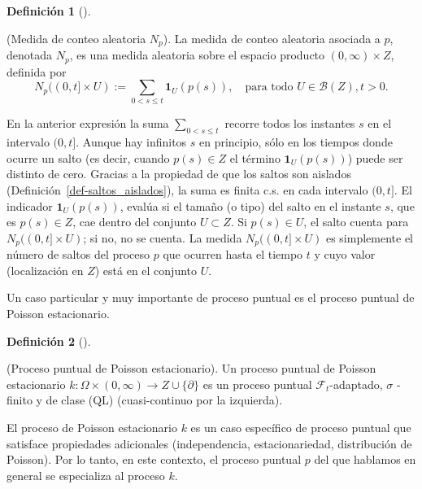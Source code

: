 \documentclass[
  spanish,
  us-letterpaper,
]{scrreprt}
\theoremstyle{plain}
\theoremstyle{plain}
\theoremstyle{definition}
\newtheorem{definition}{Definición}[chapter]
\theoremstyle{remark}
\begin{document}
\begin{definition}[]\protect\hypertarget{def-3}{}\label{def-3}

(Medida de conteo aleatoria \(N_p\)). La medida de conteo aleatoria
asociada a \(p\), denotada \(N_p\), es una medida aleatoria sobre el
espacio producto \((0,\infty) \times Z\), definida por
\[N_p((0,t] \times U) := \sum_{0 < s \leq t} \mathbf{1}_U(p(s)), \quad \text{para todo } U \in \mathcal{B}(Z),  t > 0.\]

\end{definition}

En la anterior expresión la suma \(\sum_{0 < s \leq t}\) recorre todos
los instantes \(s\) en el intervalo \((0,t]\). Aunque hay infinitos
\(s\) en principio, sólo en los tiempos donde ocurre un salto (es decir,
cuando \(p(s) \in Z\) el término \(\mathbf{1}_U(p(s))\)) puede ser
distinto de cero. Gracias a la propiedad de que los saltos son aislados
(Definición~\ref{def-saltos_aislados}), la suma es finita c.s. en cada
intervalo \((0,t]\). El indicador \(\mathbf{1}_U(p(s))\), evalúa si el
tamaño (o tipo) del salto en el instante \(s\), que es \(p(s) \in Z\),
cae dentro del conjunto \(U \subset Z\). Si \(p(s) \in U\), el salto
cuenta para \(N_p((0,t] \times U)\); si no, no se cuenta. La medida
\(N_p((0,t] \times U)\) es simplemente el número de saltos del proceso
\(p\) que ocurren hasta el tiempo \(t\) y cuyo valor (localización en
\(Z\)) está en el conjunto \(U\).

Un caso particular y muy importante de proceso puntual es el proceso
puntual de Poisson estacionario.

\begin{definition}[]\protect\hypertarget{def-Proc_pun_poiss_esta}{}\label{def-Proc_pun_poiss_esta}

(Proceso puntual de Poisson estacionario). Un proceso puntual de Poisson
estacionario \(k:\Omega\times(0,\infty) \rightarrow Z\cup\{\partial\}\)
es un proceso puntual \(\mathcal{F}_t\)-adaptado, \(\sigma\) -finito y
de clase (QL) (cuasi-continuo por la izquierda).

\end{definition}

El proceso de Poisson estacionario \(k\) es un caso específico de
proceso puntual que satisface propiedades adicionales (independencia,
estacionariedad, distribución de Poisson). Por lo tanto, en este
contexto, el proceso puntual \(p\) del que hablamos en general se
especializa al proceso \(k\).
\end{document}
